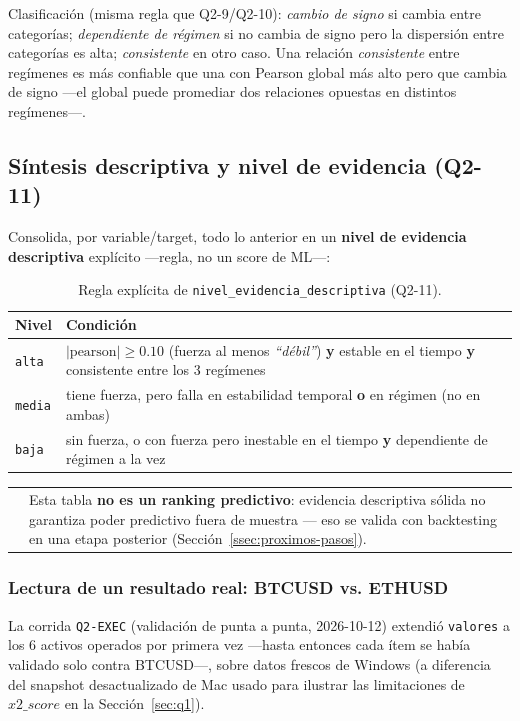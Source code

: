 \documentclass[11pt,a4paper]{article}
\makeatletter
\newcommand{\code}[1]{\texttt{\small #1}}
\newenvironment{advertencia}{%
  \par\medskip\noindent
  \begin{tabular}{@{}p{0.4em}@{\hspace{8pt}}p{\dimexpr\linewidth-2em\relax}@{}}
  \textcolor{crojo}{\rule{3pt}{1.1em}} &
}{\end{tabular}\par\medskip}
\newcommand{\dq}[1]{\emph{``#1''}}
\makeatother
\begin{document}
Clasificación (misma regla que Q2-9/Q2-10): \emph{cambio de signo} si cambia entre
categorías; \emph{dependiente de régimen} si no cambia de signo pero la dispersión entre
categorías es alta; \emph{consistente} en otro caso. Una relación \emph{consistente} entre
regímenes es más confiable que una con Pearson global más alto pero que cambia de signo
—el global puede promediar dos relaciones opuestas en distintos regímenes—.

\subsection{Síntesis descriptiva y nivel de evidencia (Q2-11)}

Consolida, por variable/target, todo lo anterior en un \textbf{nivel de evidencia
descriptiva} explícito —regla, no un score de ML—:

\begin{table}[h]
\centering
\small
\begin{tabularx}{\linewidth}{@{}l X@{}}
\toprule
\textbf{Nivel} & \textbf{Condición} \\
\midrule
\code{alta} & \(|\text{pearson}| \geq 0.10\) (fuerza al menos \dq{débil}) \textbf{y}
  estable en el tiempo \textbf{y} consistente entre los 3 regímenes \\
\code{media} & tiene fuerza, pero falla en estabilidad temporal \textbf{o} en régimen (no
  en ambas) \\
\code{baja} & sin fuerza, o con fuerza pero inestable en el tiempo \textbf{y} dependiente
  de régimen a la vez \\
\bottomrule
\end{tabularx}
\caption{Regla explícita de \code{nivel\_evidencia\_descriptiva} (Q2-11).}
\end{table}

\begin{advertencia}
Esta tabla \textbf{no es un ranking predictivo}: evidencia descriptiva sólida no garantiza
poder predictivo fuera de muestra — eso se valida con backtesting en una etapa posterior
(Sección~\ref{ssec:proximos-pasos}).
\end{advertencia}

\subsubsection*{Lectura de un resultado real: BTCUSD vs. ETHUSD}

La corrida \code{Q2-EXEC} (validación de punta a punta, 2026-10-12) extendió
\code{valores} a los 6 activos operados por primera vez —hasta entonces cada ítem se había
validado solo contra BTCUSD—, sobre datos frescos de Windows (a diferencia del snapshot
desactualizado de Mac usado para ilustrar las limitaciones de \(x2\_score\) en la
Sección~\ref{sec:q1}).
\end{document}
